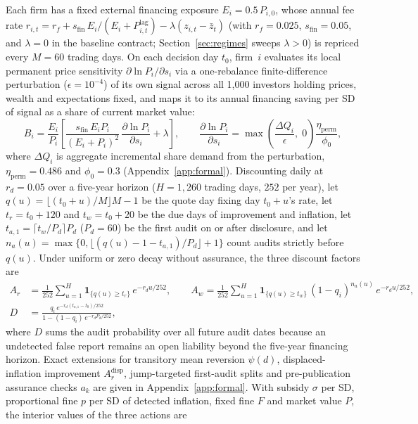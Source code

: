 \documentclass[11pt]{article}
\begin{document}
Each firm has a fixed external financing exposure $E_i = 0.5\,P_{i,0}$, whose annual fee rate $r_{i,t} = r_f + s_{\text{fin}}\,E_i/(E_i + P_{i,t}^{\text{lag}}) - \lambda(z_{i,t} - \bar z_t)$ (with $r_f = 0.025$, $s_{\text{fin}} = 0.05$, and $\lambda = 0$ in the baseline contract; Section~\ref{sec:regimes} sweeps $\lambda > 0$) is repriced every $M = 60$ trading days. On each decision day $t_0$, firm~$i$ evaluates its local permanent price sensitivity $\partial\ln P_i/\partial s_i$ via a one-rebalance finite-difference perturbation ($\epsilon = 10^{-4}$) of its own signal across all 1,000 investors holding prices, wealth and expectations fixed, and maps it to its annual financing saving per SD of signal as a share of current market value:
\begin{equation}
B_i = \frac{E_i}{P_i}\left[\frac{s_{\text{fin}}\,E_i P_i}{(E_i + P_i)^2}\,\frac{\partial\ln P_i}{\partial s_i} + \lambda\right], \qquad \frac{\partial\ln P_i}{\partial s_i} = \max\!\left(\frac{\Delta Q_i}{\epsilon},\;0\right)\frac{\eta_{\text{perm}}}{\phi_0},
\label{eq:benefit}
\end{equation}
where $\Delta Q_i$ is aggregate incremental share demand from the perturbation, $\eta_{\text{perm}} = 0.486$ and $\phi_0 = 0.3$ (Appendix~\ref{app:formal}). Discounting daily at $r_d = 0.05$ over a five-year horizon ($H = 1{,}260$ trading days, $252$ per year), let $q(u) = \lfloor(t_0 + u)/M\rfloor M - 1$ be the quote day fixing day $t_0 + u$'s rate, let $t_r = t_0 + 120$ and $t_w = t_0 + 20$ be the due days of improvement and inflation, let $t_{a,1} = \lceil t_w / P_d \rceil P_d$ ($P_d = 60$) be the first audit on or after disclosure, and let $n_a(u) = \max\{0, \lfloor(q(u) - 1 - t_{a,1})/P_d\rfloor + 1\}$ count audits strictly before $q(u)$. Under uniform or zero decay without assurance, the three discount factors are
\begin{align}
A_r &= \frac{1}{252}\sum_{u=1}^{H} \mathbf{1}_{\{q(u)\ge t_r\}}\,e^{-r_d u/252}, \qquad
A_w = \frac{1}{252}\sum_{u=1}^{H} \mathbf{1}_{\{q(u)\ge t_w\}}\,(1 - q_i)^{n_a(u)}\,e^{-r_d u/252}, \label{eq:annuities}\\
D &= \frac{q_i\,e^{-r_d(t_{a,1} - t_0)/252}}{1 - (1 - q_i)\,e^{-r_d P_d/252}}, \label{eq:finefactor}
\end{align}
where $D$ sums the audit probability over all future audit dates because an undetected false report remains an open liability beyond the five-year financing horizon. Exact extensions for transitory mean reversion $\psi(d)$, displaced-inflation improvement $A_r^{\text{disp}}$, jump-targeted first-audit splits and pre-publication assurance checks $a_k$ are given in Appendix~\ref{app:formal}. With subsidy $\sigma$ per SD, proportional fine $p$ per SD of detected inflation, fixed fine $F$ and market value $P$, the interior values of the three actions are
\end{document}
